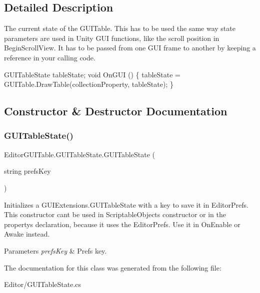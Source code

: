 \subsection{Detailed Description}
The current state of the G\+U\+I\+Table. This has to be used the same way state parameters are used in Unity G\+UI functions, like the scroll position in Begin\+Scroll\+View. It has to be passed from one G\+UI frame to another by keeping a reference in your calling code. 


\begin{DoxyCode}
GUITableState tableState;
\textcolor{keywordtype}{void} OnGUI ()
\{
    tableState = GUITable.DrawTable(collectionProperty, tableState);
\}
\end{DoxyCode}
 

\subsection{Constructor \& Destructor Documentation}
\mbox{\label{class_editor_g_u_i_table_1_1_g_u_i_table_state_aab7e8f3314020a2f5fda74e6d618d330}} 
\subsubsection{\texorpdfstring{G\+U\+I\+Table\+State()}{GUITableState()}}
{\footnotesize\ttfamily Editor\+G\+U\+I\+Table.\+G\+U\+I\+Table\+State.\+G\+U\+I\+Table\+State (\begin{DoxyParamCaption}\item[{string}]{prefs\+Key }\end{DoxyParamCaption})\hspace{0.3cm}{\ttfamily [inline]}}



Initializes a G\+U\+I\+Extensions.\+G\+U\+I\+Table\+State with a key to save it in Editor\+Prefs. This constructor can\textquotesingle{}t be used in Scriptable\+Object\textquotesingle{}s constructor or in the property\textquotesingle{}s declaration, because it uses the Editor\+Prefs. Use it in On\+Enable or Awake instead. 


\begin{DoxyParams}{Parameters}
{\em prefs\+Key} & Prefs key.\\
\hline
\end{DoxyParams}


The documentation for this class was generated from the following file\+:\begin{DoxyCompactItemize}
\item 
Editor/G\+U\+I\+Table\+State.\+cs\end{DoxyCompactItemize}
